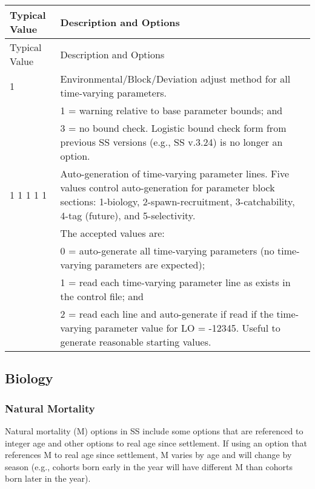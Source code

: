 	
\begin{longtable}{p{0.5cm} p{2cm} p{12cm}}
	\hline
	\multicolumn{2}{l}{Typical Value} & Description and Options\Tstrut\Bstrut\\
	\hline
	\endfirsthead

	\hline
	\multicolumn{2}{l}{Typical Value} & Description and Options\Tstrut\Bstrut\\
	\hline
	\endhead

	\hline
	\endfoot

	\endlastfoot

	1 & & Environmental/Block/Deviation adjust method for all time-varying parameters. \Tstrut\\
	  & & 1 = warning relative to base parameter bounds; and \\
	  & & 3 = no bound check. Logistic bound check form from previous SS versions (e.g., SS v.3.24) is no longer an option.\Bstrut\\

	\multicolumn{2}{l}{1 1 1 1 1} & Auto-generation of time-varying parameter lines. Five values control auto-generation for parameter block sections: 1-biology, 2-spawn-recruitment, 3-catchability, 4-tag (future), and 5-selectivity.\\
	& 			& The accepted values are:\\
	&           & 0 = auto-generate all time-varying parameters (no time-varying parameters are expected);\\
	& 			& 1 = read each time-varying parameter line as exists in the control file; and\\
	&			& 2 = read each line and auto-generate if read if the time-varying parameter value for LO = -12345. Useful to generate reasonable starting values.  \Bstrut\\
	\hline
\end{longtable}


\subsection{Biology}
\subsubsection{Natural Mortality}
Natural mortality (M) options in SS include some options that are referenced to integer age and other options to real age since settlement.  If using an option that references M to real age since settlement, M varies by age and will change by season (e.g., cohorts born early in the year will have different M than cohorts born later in the year).

